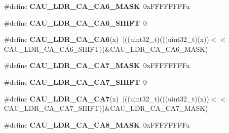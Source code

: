 \begin{DoxyCompactItemize}
\item 
\#define {\bfseries C\+A\+U\+\_\+\+L\+D\+R\+\_\+\+C\+A\+\_\+\+C\+A6\+\_\+\+M\+A\+SK}~0x\+F\+F\+F\+F\+F\+F\+F\+Fu\hypertarget{group__CAU__Register__Masks_ga36f44124efda969e60d5366ac7cc7350}{}\label{group__CAU__Register__Masks_ga36f44124efda969e60d5366ac7cc7350}

\item 
\#define {\bfseries C\+A\+U\+\_\+\+L\+D\+R\+\_\+\+C\+A\+\_\+\+C\+A6\+\_\+\+S\+H\+I\+FT}~0\hypertarget{group__CAU__Register__Masks_gae0d78056f6ad5c5565d3f767b72335cb}{}\label{group__CAU__Register__Masks_gae0d78056f6ad5c5565d3f767b72335cb}

\item 
\#define {\bfseries C\+A\+U\+\_\+\+L\+D\+R\+\_\+\+C\+A\+\_\+\+C\+A6}(x)~(((uint32\+\_\+t)(((uint32\+\_\+t)(x))$<$$<$C\+A\+U\+\_\+\+L\+D\+R\+\_\+\+C\+A\+\_\+\+C\+A6\+\_\+\+S\+H\+I\+FT))\&C\+A\+U\+\_\+\+L\+D\+R\+\_\+\+C\+A\+\_\+\+C\+A6\+\_\+\+M\+A\+SK)\hypertarget{group__CAU__Register__Masks_ga3441da8acbdcfca4ba70891206ba3091}{}\label{group__CAU__Register__Masks_ga3441da8acbdcfca4ba70891206ba3091}

\item 
\#define {\bfseries C\+A\+U\+\_\+\+L\+D\+R\+\_\+\+C\+A\+\_\+\+C\+A7\+\_\+\+M\+A\+SK}~0x\+F\+F\+F\+F\+F\+F\+F\+Fu\hypertarget{group__CAU__Register__Masks_ga0aa892e32b2be9b3958706939c94ef3b}{}\label{group__CAU__Register__Masks_ga0aa892e32b2be9b3958706939c94ef3b}

\item 
\#define {\bfseries C\+A\+U\+\_\+\+L\+D\+R\+\_\+\+C\+A\+\_\+\+C\+A7\+\_\+\+S\+H\+I\+FT}~0\hypertarget{group__CAU__Register__Masks_ga8630e23e305784aed9a981844b18f468}{}\label{group__CAU__Register__Masks_ga8630e23e305784aed9a981844b18f468}

\item 
\#define {\bfseries C\+A\+U\+\_\+\+L\+D\+R\+\_\+\+C\+A\+\_\+\+C\+A7}(x)~(((uint32\+\_\+t)(((uint32\+\_\+t)(x))$<$$<$C\+A\+U\+\_\+\+L\+D\+R\+\_\+\+C\+A\+\_\+\+C\+A7\+\_\+\+S\+H\+I\+FT))\&C\+A\+U\+\_\+\+L\+D\+R\+\_\+\+C\+A\+\_\+\+C\+A7\+\_\+\+M\+A\+SK)\hypertarget{group__CAU__Register__Masks_gad7bbc0cca5ec64cec77f9b0602024cda}{}\label{group__CAU__Register__Masks_gad7bbc0cca5ec64cec77f9b0602024cda}

\item 
\#define {\bfseries C\+A\+U\+\_\+\+L\+D\+R\+\_\+\+C\+A\+\_\+\+C\+A8\+\_\+\+M\+A\+SK}~0x\+F\+F\+F\+F\+F\+F\+F\+Fu\hypertarget{group__CAU__Register__Masks_ga85639a056055e9b13bd051f13fa061f8}{}\label{group__CAU__Register__Masks_ga85639a056055e9b13bd051f13fa061f8}


\end{DoxyCompactItemize}
